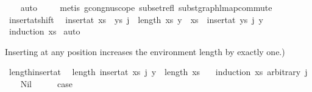 \begin{isabellebody}
\ \ \isamarkupfalse%
\ auto\isanewline
\ \ \ \isamarkupfalse%
\ {\isacharparenleft}{\kern0pt}metis\ gcong{\isachardot}{\kern0pt}nu{\isacharunderscore}{\kern0pt}scope\ subset{\isacharunderscore}{\kern0pt}refl\ subst{\isacharunderscore}{\kern0pt}graph{\isacharunderscore}{\kern0pt}lmap{\isacharunderscore}{\kern0pt}commute{\isacharparenright}{\kern0pt}\isanewline
{}\isamarkupfalse%
%
\endisatagproof
{\isafoldproof}%
%
\isadelimproof
%
\endisadelimproof
%
\isadelimdocument
%
\endisadelimdocument
%
\isatagdocument
%
\isamarkuptrue%
%
\endisatagdocument
{\isafolddocument}%
%
\isadelimdocument
%
\endisadelimdocument
{}\isamarkupfalse%
\ insert{\isacharunderscore}{\kern0pt}at{\isacharunderscore}{\kern0pt}shift{\isacharcolon}{\kern0pt}\isanewline
\ \ {\isachardoublequoteopen}insert{\isacharunderscore}{\kern0pt}at\ {\isacharparenleft}{\kern0pt}xs\ {\isacharat}{\kern0pt}\ ys{\isacharparenright}{\kern0pt}\ {\isacharparenleft}{\kern0pt}j\ {\isacharplus}{\kern0pt}\ length\ xs{\isacharparenright}{\kern0pt}\ y\ {\isacharequal}{\kern0pt}\ xs\ {\isacharat}{\kern0pt}\ insert{\isacharunderscore}{\kern0pt}at\ ys\ j\ y{\isachardoublequoteclose}\isanewline
%
\isadelimproof
%
\endisadelimproof
%
\isatagproof
{}\isamarkupfalse%
\ {\isacharparenleft}{\kern0pt}induction\ xs{\isacharparenright}{\kern0pt}\isanewline
{}\isamarkupfalse%
\ auto%
\endisatagproof
{\isafoldproof}%
%
\isadelimproof
%
\endisadelimproof
%
\begin{isamarkuptext}%
Inserting at any position increases the environment length by exactly one.)%
\end{isamarkuptext}\isamarkuptrue%
\isamarkupfalse%
\ length{\isacharunderscore}{\kern0pt}insert{\isacharunderscore}{\kern0pt}at{\isacharcolon}{\kern0pt}\isanewline
\ \ {\isachardoublequoteopen}length\ {\isacharparenleft}{\kern0pt}insert{\isacharunderscore}{\kern0pt}at\ xs\ j\ y{\isacharparenright}{\kern0pt}\ {\isacharequal}{\kern0pt}\ length\ xs\ {\isacharplus}{\kern0pt}\ {}{\isachardoublequoteclose}\isanewline
%
\isadelimproof
%
\endisadelimproof
%
\isatagproof
{}\isamarkupfalse%
\ {\isacharparenleft}{\kern0pt}induction\ xs\ arbitrary{\isacharcolon}{\kern0pt}\ j{\isacharparenright}{\kern0pt}\isanewline
\ \ \isamarkupfalse%
\ Nil\isanewline
\ \ \isamarkupfalse%
\ \isamarkupfalse%
\ {\isacharquery}{\kern0pt}case\isanewline
\ \ \isamarkupfalse%

\end{isabellebody}
